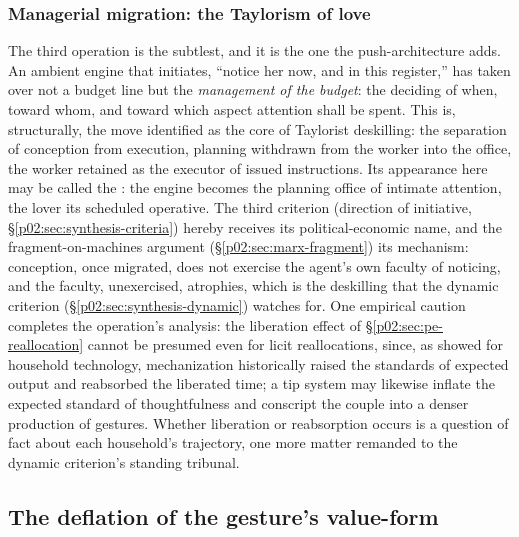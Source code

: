 \subsubsection{Managerial migration: the Taylorism of love}
\label{p02:sec:pe-management}

The third operation is the subtlest, and it is the one the push-architecture adds. An ambient engine that initiates, ``notice her now, and in this register,'' has taken over not a budget line but the \emph{management of the budget}: the deciding of when, toward whom, and toward which aspect attention shall be spent. This is, structurally, the move \textcite{braverman1974labor} identified as the core of Taylorist deskilling: the separation of conception from execution, planning withdrawn from the worker into the office, the worker retained as the executor of issued instructions. Its appearance here may be called the : the engine becomes the planning office of intimate attention, the lover its scheduled operative. The third criterion (direction of initiative, \S\ref{p02:sec:synthesis-criteria}) hereby receives its political-economic name, and the fragment-on-machines argument (\S\ref{p02:sec:marx-fragment}) its mechanism: conception, once migrated, does not exercise the agent's own faculty of noticing, and the faculty, unexercised, atrophies, which is the deskilling that the dynamic criterion (\S\ref{p02:sec:synthesis-dynamic}) watches for. One empirical caution completes the operation's analysis: the liberation effect of \S\ref{p02:sec:pe-reallocation} cannot be presumed even for licit reallocations, since, as \textcite{cowan1983more} showed for household technology, mechanization historically raised the standards of expected output and reabsorbed the liberated time; a tip system may likewise inflate the expected standard of thoughtfulness and conscript the couple into a denser production of gestures. Whether liberation or reabsorption occurs is a question of fact about each household's trajectory, one more matter remanded to the dynamic criterion's standing tribunal.

\subsection{The deflation of the gesture's value-form}
\label{p02:sec:pe-deflation}

